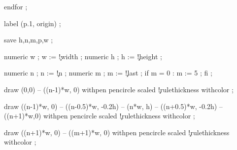   endfor ;

  label (p.1, origin) ;

\stopuseMPgraphic




  save h,n,m,p,w ;

  numeric w ; w := \visualcounterparameter\c!width ;
  numeric h ; h := \visualcounterparameter\c!height ;

  numeric n ; n := \visualcounterparameter\c!n ;
  numeric m ; m := \visualcounterparameter\c!last ;
  if m = 0 : m := 5 ; fi ;

  draw (0,0) -- ((n-1)*w, 0) 
      withpen pencircle scaled \visualcounterparameter\c!rulethickness\space
      withcolor  ;

  draw ((n-1)*w, 0) -- ((n-0.5)*w, -0.2h) -- (n*w, h) -- ((n+0.5)*w, -0.2h) -- ((n+1)*w,0)
      withpen pencircle scaled \visualcounterparameter\c!rulethickness\space
      withcolor  ;

  draw ((n+1)*w, 0) -- ((m+1)*w, 0)
      withpen pencircle scaled \visualcounterparameter\c!rulethickness\space
      withcolor  ;

\stopuseMPgraphic


\protect
